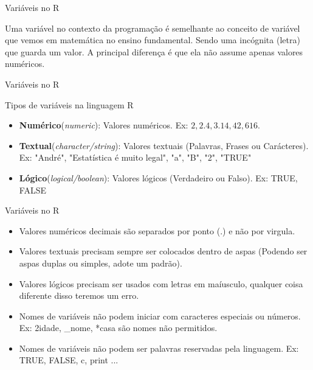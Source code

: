 \documentclass{beamer}
\begin{document}
\begin{frame}{Variáveis no R}
  \begin{definicao}
  Uma variável no contexto da programação é semelhante ao conceito de variável que vemos em matemática no ensino fundamental.
  Sendo uma incógnita (letra) que guarda um valor. A principal diferença é que ela não assume apenas valores numéricos. 
  \end{definicao}
  
\end{frame}

\begin{frame}{Variáveis no R}
 
  {\color{gray}\large Tipos de variáveis na linguagem R}
 \vspace{0.4cm} %
  \begin{itemize}
    \item \textbf{Numérico}(\textit{numeric}): Valores numéricos. Ex: $2, 2.4, 3.14, 42, 616$.
    \item \textbf{Textual}(\textit{character/string}): Valores textuais (Palavras, Frases ou Carácteres). Ex: "André", "Estatística é muito legal", "a", "B", "2", "TRUE"
    \item \textbf{Lógico}(\textit{logical/boolean}): Valores lógicos (Verdadeiro ou Falso). Ex: TRUE, FALSE
  \end{itemize}
\end{frame}

\begin{frame}{Variáveis no R}
\begin{atencao}
\begin{itemize}
  \item Valores numéricos decimais são separados por ponto (.) e não por virgula. 
  \item Valores textuais precisam sempre ser colocados dentro de aspas (Podendo ser aspas duplas ou simples, adote um padrão).
  \item Valores lógicos precisam ser usados com letras em maíusculo, qualquer coisa diferente disso teremos um erro. 
  \item Nomes de variáveis não podem iniciar com caracteres especiais ou números. Ex: 2idade, \_nome, *casa são nomes não permitidos. 
  \item Nomes de variáveis não podem ser palavras reservadas pela linguagem. Ex: TRUE, FALSE, c, print ...
\end{itemize}
\end{atencao}
\end{frame}
\end{document}
